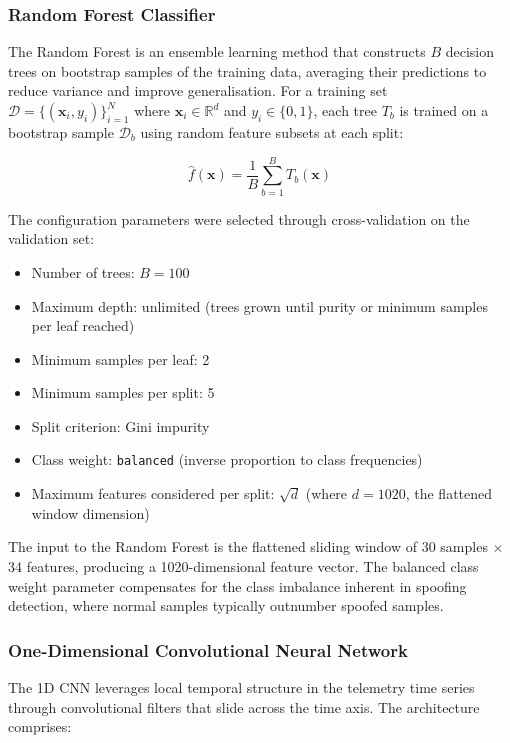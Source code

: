 \documentclass[electronics,article,accept,moreauthors]{Definitions/mdpi}
\begin{document}
\subsubsection{Random Forest Classifier}

The Random Forest \citep{pedregosa2011} is an ensemble learning method that constructs $B$ decision trees on bootstrap samples of the training data, averaging their predictions to reduce variance and improve generalisation. For a training set $\mathcal{D} = \{(\mathbf{x}_i, y_i)\}_{i=1}^N$ where $\mathbf{x}_i \in \mathbb{R}^d$ and $y_i \in \{0, 1\}$, each tree $T_b$ is trained on a bootstrap sample $\mathcal{D}_b$ using random feature subsets at each split:

\begin{equation}
\hat{f}(\mathbf{x}) = \frac{1}{B} \sum_{b=1}^{B} T_b(\mathbf{x})
\label{eq:rf}
\end{equation}

The configuration parameters were selected through cross-validation on the validation set:
\begin{itemize}
\item Number of trees: $B = 100$
\item Maximum depth: unlimited (trees grown until purity or minimum samples per leaf reached)
\item Minimum samples per leaf: 2
\item Minimum samples per split: 5
\item Split criterion: Gini impurity
\item Class weight: {\tt balanced} (inverse proportion to class frequencies)
\item Maximum features considered per split: $\sqrt{d}$ (where $d = 1020$, the flattened window dimension)
\end{itemize}

The input to the Random Forest is the flattened sliding window of 30 samples $\times$ 34 features, producing a 1020-dimensional feature vector. The balanced class weight parameter compensates for the class imbalance inherent in spoofing detection, where normal samples typically outnumber spoofed samples.

\subsubsection{One-Dimensional Convolutional Neural Network}

The 1D CNN \citep{paszke2019} leverages local temporal structure in the telemetry time series through convolutional filters that slide across the time axis. The architecture comprises:
\end{document}
